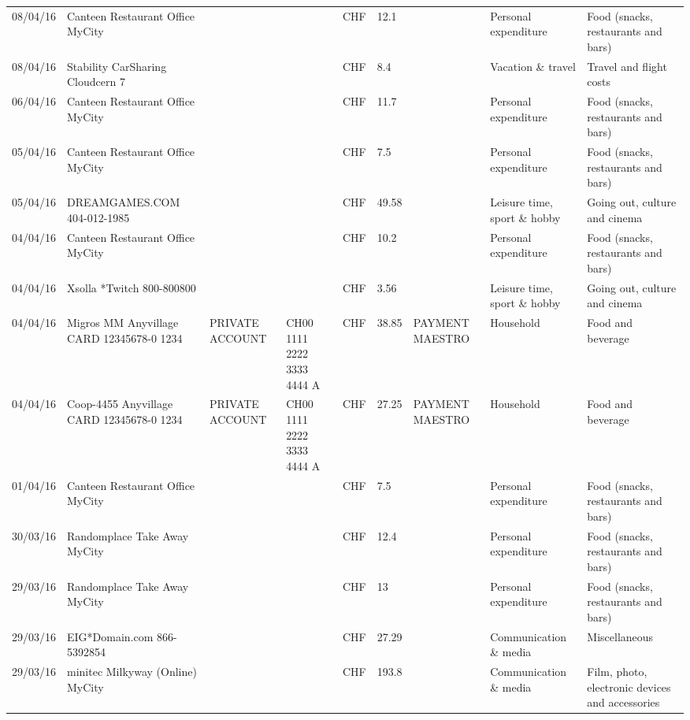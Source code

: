 \begin{landscape}
\begin{table}[t]
\begin{center}
\begin{tabular}{lllllllll}
		08/04/16 & Canteen Restaurant Office      MyCity &       &       & CHF   & 12.1  &       & Personal expenditure & Food (snacks, restaurants and bars) \\
		08/04/16 & Stability CarSharing      Cloudcern 7 &       &       & CHF   & 8.4   &       & Vacation \& travel & Travel and flight costs \\
		06/04/16 & Canteen Restaurant Office      MyCity &       &       & CHF   & 11.7  &       & Personal expenditure & Food (snacks, restaurants and bars) \\
		05/04/16 & Canteen Restaurant Office      MyCity &       &       & CHF   & 7.5   &       & Personal expenditure & Food (snacks, restaurants and bars) \\
		05/04/16 & DREAMGAMES.COM           404-012-1985 &       &       & CHF   & 49.58 &       & Leisure time, sport \& hobby & Going out, culture and cinema \\
		04/04/16 & Canteen Restaurant Office      MyCity &       &       & CHF   & 10.2  &       & Personal expenditure & Food (snacks, restaurants and bars) \\
		04/04/16 & Xsolla *Twitch           800-800800 &       &       & CHF   & 3.56  &       & Leisure time, sport \& hobby & Going out, culture and cinema \\
		04/04/16 & Migros MM Anyvillage CARD 12345678-0 1234 & PRIVATE ACCOUNT & CH00 1111 2222 3333 4444 A & CHF   & 38.85 & PAYMENT MAESTRO & Household & Food and beverage \\
		04/04/16 & Coop-4455 Anyvillage CARD 12345678-0 1234 & PRIVATE ACCOUNT & CH00 1111 2222 3333 4444 A & CHF   & 27.25 & PAYMENT MAESTRO & Household & Food and beverage \\
		01/04/16 & Canteen Restaurant Office      MyCity &       &       & CHF   & 7.5   &       & Personal expenditure & Food (snacks, restaurants and bars) \\
		30/03/16 & Randomplace Take Away     MyCity &       &       & CHF   & 12.4  &       & Personal expenditure & Food (snacks, restaurants and bars) \\
		29/03/16 & Randomplace Take Away     MyCity &       &       & CHF   & 13    &       & Personal expenditure & Food (snacks, restaurants and bars) \\
		29/03/16 & EIG*Domain.com           866-5392854 &       &       & CHF   & 27.29 &       & Communication \& media & Miscellaneous \\
		29/03/16 & minitec Milkyway (Online) MyCity &       &       & CHF   & 193.8 &       & Communication \& media & Film, photo, electronic devices and accessories \\

\end{tabular}
\end{center}
\end{table}
\end{landscape}
